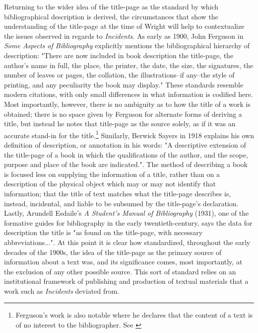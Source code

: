 Returning to the wider idea of the title-page as the standard by which bibliographical description is derived, the circumstances that show the understanding of the title-page at the time of Wright will help to contextualize the issues observed in regards to \textit{Incidents}. As early as 1900, John Ferguson in \textit{Some Aspects of Bibliography} explicitly mentions the bibliographical hierarchy of description: "There are now included in book description the title-page, the author's name in full, the place, the printer, the date, the size, the signatures, the number of leaves or pages, the collation, the illustrations--if any--the style of printing, and any peculiarity the book may display."\autocite[10]{ferguson_aspects_1900} These standards resemble modern citations, with only small differences in what information is codified here. Most importantly, however, there is no ambiguity as to how the title of a work is obtained; there is no space given by Ferguson for alternate forms of deriving a title, but instead he notes that title-page as the source solely, as if it was an accurate stand-in for the title.\footnote{Ferguson's work is also notable where he declares that the content of a text is of no interest to the bibliographer. See \autocite[51-2]{ferguson_aspects_1900}} Similarly, Berwick Sayers in 1918 explains his own definition of description, or annotation in his words: "A descriptive extension of the title-page of a book in which the qualifications of the author, and the scope, purpose and place of the book are indicated."\autocite[2]{sayers_first_1918}. The method of describing a book is focused less on supplying the information of a title, rather than on a description of the physical object which may or may not identify that information; that the title of text matches what the title-page describes is, instead, incidental, and liable to be subsumed by the title-page's declaration. Lastly, Arundell Esdaile's \textit{A Student's Manual of Bibliography} (1931), one of the formative guides for bibliography in the early twentieth-century, says the data for description the title is "as found on the title-page, with necessary abbreviations..."\autocite[250]{arundell_esdaile_students_1931}. At this point it is clear how standardized, throughout the early decades of the 1900s, the idea of the title-page as the primary source of information about a text was, and its significance comes, most importantly, at the exclusion of any other possible source. This sort of standard relies on an institutional framework of publishing and production of textual materials that a work such as \textit{Incidents} deviated from.

